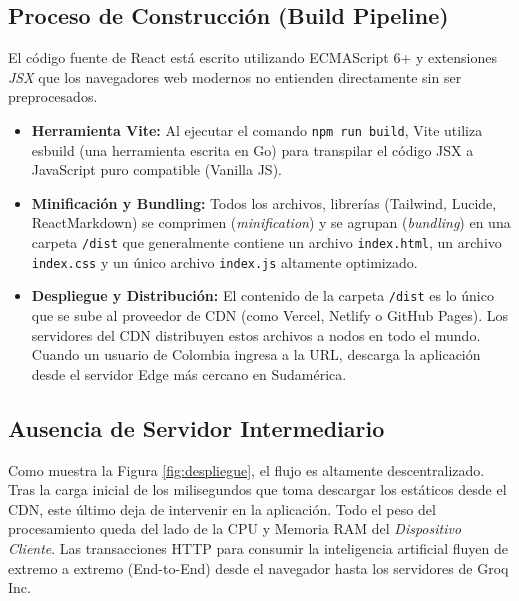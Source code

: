 \subsection{Proceso de Construcción (Build Pipeline)}
El código fuente de React está escrito utilizando ECMAScript 6+ y extensiones \textit{JSX} que los navegadores web modernos no entienden directamente sin ser preprocesados.
\begin{itemize}
    \item \textbf{Herramienta Vite:} Al ejecutar el comando \texttt{npm run build}, Vite utiliza esbuild (una herramienta escrita en Go) para transpilar el código JSX a JavaScript puro compatible (Vanilla JS).
    \item \textbf{Minificación y Bundling:} Todos los archivos, librerías (Tailwind, Lucide, ReactMarkdown) se comprimen (\textit{minification}) y se agrupan (\textit{bundling}) en una carpeta \texttt{/dist} que generalmente contiene un archivo \texttt{index.html}, un archivo \texttt{index.css} y un único archivo \texttt{index.js} altamente optimizado.
    \item \textbf{Despliegue y Distribución:} El contenido de la carpeta \texttt{/dist} es lo único que se sube al proveedor de CDN (como Vercel, Netlify o GitHub Pages). Los servidores del CDN distribuyen estos archivos a nodos en todo el mundo. Cuando un usuario de Colombia ingresa a la URL, descarga la aplicación desde el servidor Edge más cercano en Sudamérica.
\end{itemize}

\subsection{Ausencia de Servidor Intermediario}
Como muestra la Figura \ref{fig:despliegue}, el flujo es altamente descentralizado. Tras la carga inicial de los milisegundos que toma descargar los estáticos desde el CDN, este último deja de intervenir en la aplicación. Todo el peso del procesamiento queda del lado de la CPU y Memoria RAM del \textit{Dispositivo Cliente}. Las transacciones HTTP para consumir la inteligencia artificial fluyen de extremo a extremo (End-to-End) desde el navegador hasta los servidores de Groq Inc.
